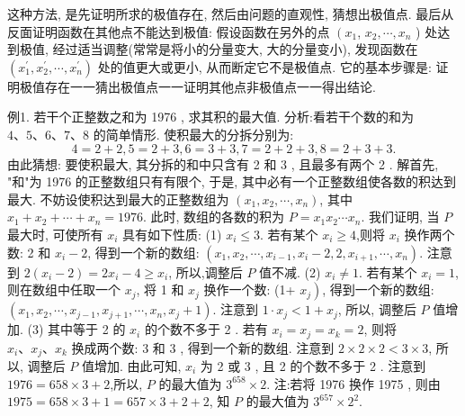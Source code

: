 
这种方法, 是先证明所求的极值存在, 然后由问题的直观性, 猜想出极值点.
最后从反面证明函数在其他点不能达到极值: 假设函数在另外的点 $\left(x_1\right.$, $x_2, \cdots, x_n$ ) 处达到极值, 经过适当调整(常常是将小的分量变大, 大的分量变小), 发现函数在 $\left(x_1^{\prime}, x_2^{\prime}, \cdots, x_n^{\prime}\right)$ 处的值更大或更小, 从而断定它不是极值点.
它的基本步骤是:
证明极值存在一一猜出极值点一一证明其他点非极值点一一得出结论.



例1. 若干个正整数之和为 1976 , 求其积的最大值.
分析:看若干个数的和为 $4 、 5 、 6 、 7 、 8$ 的简单情形.
使积最大的分拆分别为:
$$
4=2+2,5=2+3,6=3+3,7=2+2+3,8=2+3+3 .
$$
由此猜想: 要使积最大, 其分拆的和中只含有 2 和 3 , 且最多有两个 2 .
解首先, "和"为 1976 的正整数组只有有限个, 于是, 其中必有一个正整数组使各数的积达到最大.
不妨设使积达到最大的正整数组为 $\left(x_1, x_2, \cdots, x_n\right)$, 其中 $x_1+x_2+\cdots+ x_n=1976$. 此时, 数组的各数的积为 $P=x_1 x_2 \cdots x_n$. 我们证明, 当 $P$ 最大时, 可使所有 $x_i$ 具有如下性质:
(1) $x_i \leqslant 3$.
若有某个 $x_i \geqslant 4$,则将 $x_i$ 换作两个数: 2 和 $x_i-2$, 得到一个新的数组: $\left(x_1, x_2, \cdots, x_{i-1}, x_i-2,2, x_{i+1}, \cdots, x_n\right)$. 注意到 $2\left(x_i-2\right)=2 x_i-4 \geqslant x_i$, 所以,调整后 $P$ 值不减.
(2) $x_i \neq 1$.
若有某个 $x_i=1$, 则在数组中任取一个 $x_j$, 将 1 和 $x_j$ 换作一个数: (1+ $\left.x_j\right)$, 得到一个新的数组: $\left(x_1, x_2, \cdots, x_{j-1}, x_{j+1}, \cdots, x_n, x_j+1\right)$. 注意到 $1 \cdot x_j<1+x_j$, 所以, 调整后 $P$ 值增加.
(3) 其中等于 2 的 $x_i$ 的个数不多于 2 .
若有 $x_i=x_j=x_k=2$, 则将 $x_i 、 x_j 、 x_k$ 换成两个数: 3 和 3 , 得到一个新的数组.
注意到 $2 \times 2 \times 2<3 \times 3$, 所以, 调整后 $P$ 值增加.
由此可知, $x_i$ 为 2 或 3 , 且 2 的个数不多于 2 . 注意到 $1976=658 \times 3+2$,所以, $P$ 的最大值为 $3^{658} \times 2$.
注:若将 1976 换作 1975 , 则由 $1975=658 \times 3+1=657 \times 3+2+2$, 知 $P$ 的最大值为 $3^{657} \times 2^2$.



